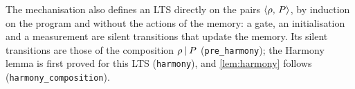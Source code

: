\begin{remark}\label{rem:prog-level}
The mechanisation also defines an LTS directly on the pairs
$\langle \rho ,\, P \rangle$, by induction on the program and without the actions of the
memory: a gate, an initialisation and a measurement are silent transitions
that update the memory. Its silent transitions are those of the composition
$\rho \mathbin{|} P$ (\texttt{pre\_harmony}); the Harmony lemma is first proved for
this LTS (\texttt{harmony}), and \cref{lem:harmony} follows
(\texttt{harmony\_composition}).
\end{remark}
